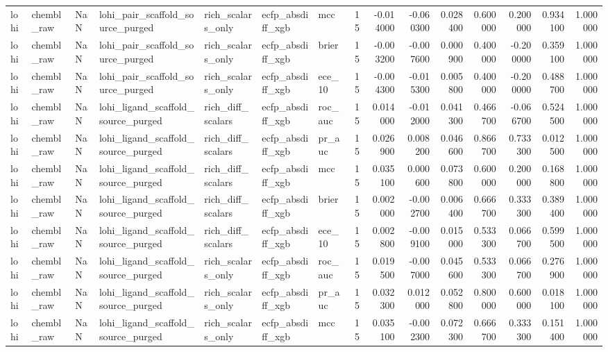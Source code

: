 \begin{longtable}{lllllllrrrrrrrr}
lohi & chembl\_raw & NaN & lohi\_pair\_scaffold\_source\_purged & rich\_scalars\_only & ecfp\_absdiff\_xgb & mcc & 15 & -0.014000 & -0.060300 & 0.028400 & 0.600000 & 0.200000 & 0.934100 & 1.000000 \\
lohi & chembl\_raw & NaN & lohi\_pair\_scaffold\_source\_purged & rich\_scalars\_only & ecfp\_absdiff\_xgb & brier & 15 & -0.003200 & -0.007600 & 0.000900 & 0.400000 & -0.200000 & 0.359100 & 1.000000 \\
lohi & chembl\_raw & NaN & lohi\_pair\_scaffold\_source\_purged & rich\_scalars\_only & ecfp\_absdiff\_xgb & ece\_10 & 15 & -0.004300 & -0.015300 & 0.005800 & 0.400000 & -0.200000 & 0.488700 & 1.000000 \\
lohi & chembl\_raw & NaN & lohi\_ligand\_scaffold\_source\_purged & rich\_diff\_scalars & ecfp\_absdiff\_xgb & roc\_auc & 15 & 0.014000 & -0.012000 & 0.041300 & 0.466700 & -0.066700 & 0.524500 & 1.000000 \\
lohi & chembl\_raw & NaN & lohi\_ligand\_scaffold\_source\_purged & rich\_diff\_scalars & ecfp\_absdiff\_xgb & pr\_auc & 15 & 0.026900 & 0.008200 & 0.046600 & 0.866700 & 0.733300 & 0.012500 & 1.000000 \\
lohi & chembl\_raw & NaN & lohi\_ligand\_scaffold\_source\_purged & rich\_diff\_scalars & ecfp\_absdiff\_xgb & mcc & 15 & 0.035100 & 0.000600 & 0.073800 & 0.600000 & 0.200000 & 0.168800 & 1.000000 \\
lohi & chembl\_raw & NaN & lohi\_ligand\_scaffold\_source\_purged & rich\_diff\_scalars & ecfp\_absdiff\_xgb & brier & 15 & 0.002000 & -0.002700 & 0.006400 & 0.666700 & 0.333300 & 0.389400 & 1.000000 \\
lohi & chembl\_raw & NaN & lohi\_ligand\_scaffold\_source\_purged & rich\_diff\_scalars & ecfp\_absdiff\_xgb & ece\_10 & 15 & 0.002800 & -0.009100 & 0.015000 & 0.533300 & 0.066700 & 0.599500 & 1.000000 \\
lohi & chembl\_raw & NaN & lohi\_ligand\_scaffold\_source\_purged & rich\_scalars\_only & ecfp\_absdiff\_xgb & roc\_auc & 15 & 0.019500 & -0.007000 & 0.045600 & 0.533300 & 0.066700 & 0.276900 & 1.000000 \\
lohi & chembl\_raw & NaN & lohi\_ligand\_scaffold\_source\_purged & rich\_scalars\_only & ecfp\_absdiff\_xgb & pr\_auc & 15 & 0.032300 & 0.012000 & 0.052800 & 0.800000 & 0.600000 & 0.018100 & 1.000000 \\
lohi & chembl\_raw & NaN & lohi\_ligand\_scaffold\_source\_purged & rich\_scalars\_only & ecfp\_absdiff\_xgb & mcc & 15 & 0.035100 & -0.002300 & 0.072300 & 0.666700 & 0.333300 & 0.151400 & 1.000000 \\

\end{longtable}
